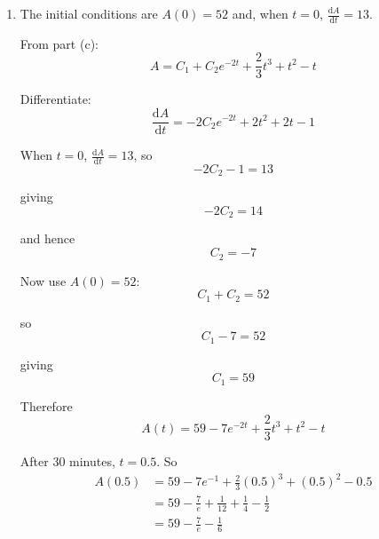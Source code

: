 \documentclass[leqno]{article}
\begin{document}
\begin{enumerate}[
  label=\textbf{\arabic*.},
  leftmargin=*,
  topsep=0pt,
  partopsep=0pt,
  parsep=0pt
]
\begin{djsSolution}
\begin{enumerate}[label=\textbf{(\alph*)}]
\begin{enumerate}[label=(\roman*)]
    \item Take
    \[
    A_p=at^3+bt^2+ct
    \]

    Then
    \[
    \frac{\mathrm{d}A_p}{\mathrm{d}t}=3at^2+2bt+c,
    \qquad
    \frac{\mathrm{d}^2A_p}{\mathrm{d}t^2}=6at+2b
    \]

    Substitute into
    \[
    \frac{\mathrm{d}^2A}{\mathrm{d}t^2}+2\frac{\mathrm{d}A}{\mathrm{d}t}=4t^2+8t
    \]

    to get
    \begin{align*}
    (6at+2b)+2(3at^2+2bt+c)&=4t^2+8t \\
    6at^2+(6a+4b)t+(2b+2c)&=4t^2+8t
    \end{align*}

    Equating coefficients of powers of \(t\):
    \[
    6a=4,\qquad 6a+4b=8,\qquad 2b+2c=0
    \]

    So
    \[
    a=\frac{2}{3},\qquad b=1,\qquad c=-1
    \]

    Thus
    \[
    A_p=\frac{2}{3}t^3+t^2-t
    \]

    Combining with the complementary function, the general solution is
    \[
    A=C_1+C_2e^{-2t}+\frac{2}{3}t^3+t^2-t
    \]
  \end{enumerate}

  \item The initial conditions are \(A(0)=52\) and, when \(t=0\), \(\frac{\mathrm{d}A}{\mathrm{d}t}=13\).

  From part (c):
  \[
  A= C_1+C_2e^{-2t}+\frac{2}{3}t^3+t^2-t
  \]

  Differentiate:
  \[
  \frac{\mathrm{d}A}{\mathrm{d}t}=-2C_2e^{-2t}+2t^2+2t-1
  \]

  When \(t=0\), \(\frac{\mathrm{d}A}{\mathrm{d}t}=13\), so
  \[
  -2C_2-1=13
  \]

  giving
  \[
  -2C_2=14
  \]

  and hence
  \[
  C_2=-7
  \]

  Now use \(A(0)=52\):
  \[
  C_1+C_2=52
  \]

  so
  \[
  C_1-7=52
  \]

  giving
  \[
  C_1=59
  \]

  Therefore
  \[
  A(t)=59-7e^{-2t}+\frac{2}{3}t^3+t^2-t
  \]

  After \(30\) minutes, \(t=0.5\). So
  \begin{align*}
  A(0.5)
  &=59-7e^{-1}+\frac{2}{3}(0.5)^3+(0.5)^2-0.5 \\
  &=59-\frac{7}{e}+\frac{1}{12}+\frac{1}{4}-\frac{1}{2} \\
  &=59-\frac{7}{e}-\frac{1}{6}
  \end{align*}


\end{enumerate}
\end{djsSolution}
\end{enumerate}
\end{document}
